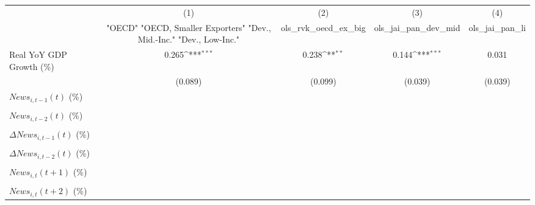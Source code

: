 {
\def\sym#1{\ifmmode^{#1}\else\(^{#1}\)\fi}
\begin{tabular}{l*{4}{c}}
\toprule
                    &\multicolumn{1}{c}{(1)}&\multicolumn{1}{c}{(2)}&\multicolumn{1}{c}{(3)}&\multicolumn{1}{c}{(4)}\\
                    &\multicolumn{1}{c}{ "OECD" "OECD, Smaller Exporters" "Dev., Mid.-Inc." "Dev., Low-Inc."}&\multicolumn{1}{c}{ols_rvk_oecd_ex_big}&\multicolumn{1}{c}{ols_jai_pan_dev_mid}&\multicolumn{1}{c}{ols_jai_pan_li}\\
\midrule
Real YoY GDP Growth (\%)&       0.265\sym{***}&       0.238\sym{**} &       0.144\sym{***}&       0.031         \\
                    &     (0.089)         &     (0.099)         &     (0.039)         &     (0.039)         \\
\addlinespace
$ News_{i,t-1}(t)$ (\%)&                     &                     &                     &                     \\
                    &                     &                     &                     &                     \\
\addlinespace
$ News_{i,t-2}(t)$ (\%)&                     &                     &                     &                     \\
                    &                     &                     &                     &                     \\
\addlinespace
$ \Delta News_{i,t-1}(t)$ (\%)&                     &                     &                     &                     \\
                    &                     &                     &                     &                     \\
\addlinespace
$ \Delta News_{i,t-2}(t)$ (\%)&                     &                     &                     &                     \\
                    &                     &                     &                     &                     \\
\addlinespace
$ News_{i,t}(t+1)$ (\%)&                     &                     &                     &                     \\
                    &                     &                     &                     &                     \\
\addlinespace
$ News_{i,t}(t+2)$ (\%)&                     &                     &                     &                     \\

\end{tabular}}
